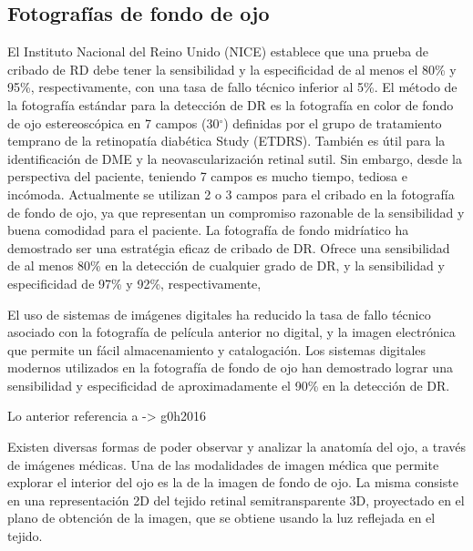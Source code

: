 
\subsection{Fotograf\'ias de fondo de ojo}

El Instituto Nacional del Reino Unido (NICE) establece que una prueba de cribado de RD debe tener la sensibilidad y la especificidad de al menos el 80\% y 95\%, respectivamente, con una tasa de fallo t\'ecnico inferior al 5\%. El m\'etodo de la fotograf\'ia est\'andar para la detecci\'on de DR es la fotograf\'ia en color de fondo de ojo estereosc\'opica en 7 campos (30$^{\circ}$) definidas por el grupo de tratamiento temprano de la retinopat\'ia diab\'etica Study (ETDRS). También es \'util para la identificaci\'on de DME y la neovascularizaci\'on retinal sutil. Sin embargo, desde la perspectiva del paciente, teniendo 7 campos es mucho tiempo, tediosa e inc\'omoda.
Actualmente se utilizan  2 o 3 campos para el cribado en la fotograf\'ia de fondo de ojo, ya que representan un compromiso razonable de la sensibilidad y buena  comodidad para el paciente.
La fotograf\'ia de fondo midr\'iatico ha demostrado ser una estrat\'egia eficaz de cribado de DR. Ofrece una sensibilidad de al menos 80\% en la detecci\'on de cualquier grado de DR, y la sensibilidad y especificidad de 97\% y 92\%, respectivamente,

El uso de sistemas de im\'agenes digitales ha reducido la tasa de fallo t\'ecnico asociado con la fotograf\'ia de pel\'icula anterior no digital, y la imagen electr\'onica que permite un f\'acil almacenamiento y catalogaci\'on. Los sistemas digitales modernos utilizados en la fotograf\'ia de fondo de ojo han demostrado lograr una sensibilidad y especificidad de aproximadamente el 90\% en la detecci\'on de DR.

Lo anterior referencia a -> g0h2016

Existen diversas formas de poder observar y analizar la anatom\'ia del ojo, a trav\'es de im\'agenes m\'edicas. 
Una de las modalidades de imagen m\'edica que permite explorar el interior del ojo es la de la imagen de fondo de ojo. La misma consiste en  una representaci\'on 2D del tejido retinal semitransparente 3D, proyectado en el plano de obtenci\'on de la imagen, que se obtiene usando la luz reflejada en el tejido.

